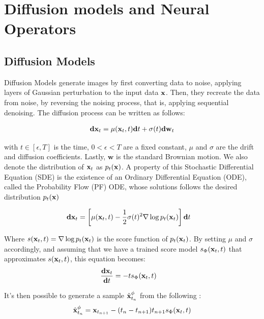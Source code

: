 \section{Diffusion models and Neural Operators} \label{sec:diffno}

\subsection{Diffusion Models}

Diffusion Models generate images by first converting data to noise, applying layers of Gaussian perturbation to the input data $\mathbf{x}$. Then, they recreate the data from noise, by reversing the noising process, that is, applying sequential denoising. The diffusion process can be written as follows:

\begin{align}
    \mathbf{d}\mathbf{x}_t = \mu(\mathbf{x}_t, t)\mathbf{d}t + \sigma(t)\mathbf{d}\mathbf{w}_t       
\end{align}

\noindent with $t \in [\epsilon, T]$ is the time, $0 < \epsilon < T$ are a fixed constant, $\mu$ and $\sigma$ are the drift and diffusion coefficients. Lastly, $\mathbf{w}$ is the standard Brownian motion. We also denote the distribution of $\mathbf{x}_t$ as $p_t(\mathbf{x})$. A property of this Stochastic Differential Equation (SDE) is the existence of an Ordinary Differential Equation (ODE), called the Probability Flow (PF) ODE, whose solutions follows the desired distribution $p_t(\mathbf{x})$

\begin{align}
    \mathbf{d}\mathbf{x}_t & = \left[ \mu(\mathbf{x}_t, t) - \frac{1}{2}\sigma(t)^2 \nabla \log p_t (\mathbf{x}_t)\right] \mathbf{d}t  \label{eq:pfode}
\end{align}

\noindent Where $s(\mathbf{x}_t, t) = \nabla \log p_t (\mathbf{x}_t)$ is the score function of $p_t(\mathbf{x}_t)$. By setting $\mu$ and $\sigma$ accordingly, and assuming that we have a trained score model $s_\Phi(\mathbf{x}_t, t)$ that approximates $s(\mathbf{x}_t, t)$, this equation becomes:
\begin{align}
    \frac{\mathbf{d}\mathbf{x}_t}{\mathbf{d}t} & = -t s_\Phi(\mathbf{x}_t, t) 
\end{align}

\noindent It's then possible to generate a sample $\hat{\mathbf{x}}_{t_n}^{\phi}$ from the following :
\begin{align}
    \hat{\mathbf{x}}_{t_n}^{\phi}  = \mathbf{x}_{t_{n+1}} - (t_n - t_{n+1})t_{n+1}s_\Phi(\mathbf{x}_t, t) \label{eq:ODE}
\end{align}

